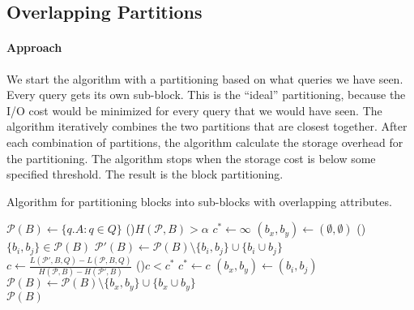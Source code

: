 \subsection{Overlapping Partitions}\label{subsec:ov-heuristic}
\noindent


\paragraph*{Approach$\,$} We start the algorithm with a   partitioning based
on what queries we have seen. Every query gets its own sub-block. This is the
``ideal'' partitioning, because the I/O cost would be minimized for every
query that we would have seen. The algorithm iteratively combines the two
partitions that are closest together.  After each combination of partitions,
the algorithm calculate the storage overhead for the partitioning. The
algorithm stops when the  storage cost is below some specified threshold.  The
result is the block partitioning.

\begin{algorithm}[ht]
\scriptsize
\caption{Algorithm for partitioning blocks into sub-blocks with overlapping attributes.}
\label{alg:overlappingP}
$\mathcal{P}(B) \leftarrow \{q.A: q\in Q\}$ 
\While(){$H(\mathcal{P},B) > \alpha$}{
  $c^{*}\gets \infty $ 
  $(b_x,b_y)\gets (\emptyset,\emptyset)$ 
  \For(){$\{b_i,b_j\}\in\mathcal{P}(B)$}{
    $\mathcal{P'}(B) \leftarrow \mathcal{P}(B) \setminus \{b_i, b_j\} \cup \{b_i \cup b_j\}$\\
    $c\gets \frac{L(\mathcal{P}',B,Q)-L(\mathcal{P},B,Q)}{H(\mathcal{P},B)-H(\mathcal{P}',B)}$
    \If(){$c<c^{*}$}{
        $c^{*}\gets c$
        $(b_x,b_y)\gets (b_i,b_j)$
    }
  }
  $\mathcal{P}(B) \leftarrow \mathcal{P}(B) \setminus \{b_x, b_y\} \cup \{b_x \cup b_y\}$ \\
}
\Return $ \mathcal{P}(B)$  
\end{algorithm} 

